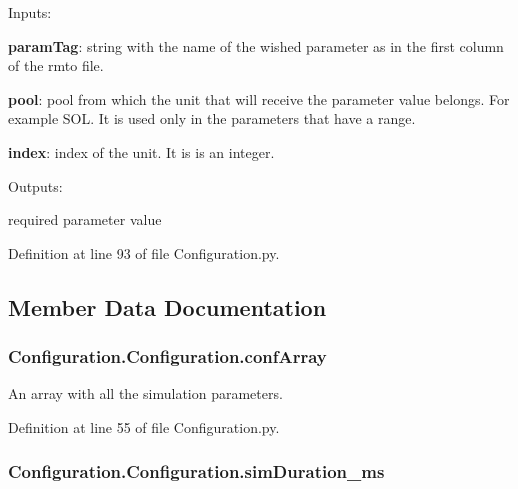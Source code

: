 \begin{DoxyItemize}
\item Inputs\+:
\begin{DoxyItemize}
\item {\bfseries param\+Tag}\+: string with the name of the wished parameter as in the first column of the rmto file.
\item {\bfseries pool}\+: pool from which the unit that will receive the parameter value belongs. For example S\+OL. It is used only in the parameters that have a range.
\item {\bfseries index}\+: index of the unit. It is is an integer.
\end{DoxyItemize}
\item Outputs\+:
\begin{DoxyItemize}
\item required parameter value 
\end{DoxyItemize}
\end{DoxyItemize}

Definition at line 93 of file Configuration.\+py.



\subsection{Member Data Documentation}
\subsubsection[{\texorpdfstring{conf\+Array}{confArray}}]{\setlength{\rightskip}{0pt plus 5cm}Configuration.\+Configuration.\+conf\+Array}\hypertarget{class_configuration_1_1_configuration_a2b8c2d210ef82ba5088de3c8c9a8725d}{}\label{class_configuration_1_1_configuration_a2b8c2d210ef82ba5088de3c8c9a8725d}


An array with all the simulation parameters. 



Definition at line 55 of file Configuration.\+py.

\subsubsection[{\texorpdfstring{sim\+Duration\+\_\+ms}{simDuration_ms}}]{\setlength{\rightskip}{0pt plus 5cm}Configuration.\+Configuration.\+sim\+Duration\+\_\+ms}\hypertarget{class_configuration_1_1_configuration_aea238884fe3daa1287aa069f35d4ad3e}{}\label{class_configuration_1_1_configuration_aea238884fe3daa1287aa069f35d4ad3e}


